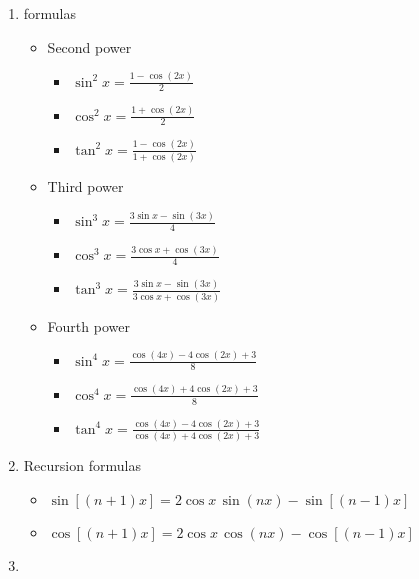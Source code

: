 \documentclass[12pt]{article}
\theoremstyle{definition}
\begin{document}
\begin{enumerate}
\item {} formulas

\begin{itemize}

\item Second power

\begin{itemize}
\item $\displaystyle \sin^2{x} = \frac{1-\cos(2x)}{2}$ 
\item $\displaystyle \cos^2{x} = \frac{1+\cos(2x)}{2}$
\item $\displaystyle \tan^2{x} = \frac{1-\cos(2x)}{1+\cos(2x)}$
\end{itemize}

\item Third power

\begin{itemize}
\item $\displaystyle \sin^3{x} = \frac{3\sin{x}-\sin(3x)}{4}$
\item $\displaystyle \cos^3{x} = \frac{3\cos{x}+\cos(3x)}{4}$
\item $\displaystyle \tan^3{x} = \frac{3\sin{x}-\sin(3x)}{3\cos{x}+\cos(3x)}$
\end{itemize}

\item Fourth power

\begin{itemize}
\item $\displaystyle \sin^4{x} = \frac{\cos(4x)-4\cos(2x)+3}{8}$
\item $\displaystyle \cos^4{x} = \frac{\cos(4x)+4\cos(2x)+3}{8}$
\item $\displaystyle \tan^4{x} = \frac{\cos(4x)-4\cos(2x)+3}{\cos(4x)+4\cos(2x)+3}$
\end{itemize}

\end{itemize}

\item Recursion formulas

\begin{itemize}
\item $\displaystyle\sin[(n\!+\!1)x] = 2\cos{x}\,\sin(nx)-\sin[(n\!-\!1)x]$ 
\item $\displaystyle\cos[(n\!+\!1)x] = 2\cos{x}\,\cos(nx)-\cos[(n\!-\!1)x]$
\end{itemize}

\item {}


\end{enumerate}
\end{document}
